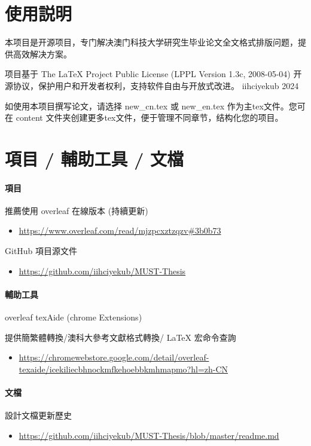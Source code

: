 \documentclass[
    writingLanguage=chinese, %
    addPageTitle=on,  %
    addDeclaration=on, %
    addMUSTlog=off, %
    addFigTOC=on, %
    addTabTOC=on, %
    refIndent=off, %
    printMod=off, %
]{.def/must}
\begin{document}
\addtableofcontents


\chapter{使用説明}
本项目是开源项目，专门解决澳门科技大学研究生毕业论文全文格式排版问题，提供高效解决方案。

项目基于 The LaTeX Project Public License (LPPL Version 1.3c, 2008-05-04) 开源协议，保护用户和开发者权利，支持软件自由与开放式改进。 \faCopyright iihciyekub 2024

如使用本项目撰写论文，请选择 new\_cn.tex 或 new\_en.tex 作为主tex文件。您可在 content 文件夹创建更多tex文件，便于管理不同章节，结构化您的项目。

\chapter{項目 / 輔助工具 / 文檔}
\subsubsection{項目}

\noindent \faLeaf\; 推薦使用 overleaf 在線版本 (持續更新) 
\begin{itemize}
    \item \url{https://www.overleaf.com/read/mjzpcxztzqzv#3b0b73}
\end{itemize}

\noindent \faGithub\;  GitHub 項目源文件 
\begin{itemize}
    \item \url{https://github.com/iihciyekub/MUST-Thesis}
\end{itemize}


\subsubsection{輔助工具}

\noindent \faChrome\; overleaf texAide (chrome Extensions) 

提供簡繁體轉換/澳科大參考文獻格式轉換/ \LaTeX{} 宏命令查詢 
\begin{itemize}
    \item \url{https://chromewebstore.google.com/detail/overleaf-texaide/icekiliecbhnockmfkehoebbkmhmapmo?hl=zh-CN}
\end{itemize}



\subsubsection{文檔}
\noindent \faHistory\; 設計文檔更新歷史 
\begin{itemize}
    \item \url{https://github.com/iihciyekub/MUST-Thesis/blob/master/readme.md}
\end{itemize}
\end{document}
